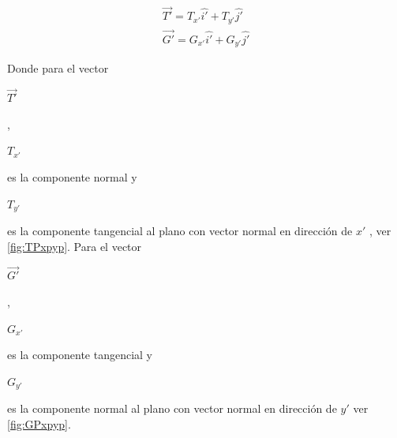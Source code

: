 \documentclass[12pt,letterpaper, twoside, openany]{article}
\begin{document}
%
\begin{large}
	\begin{align}
		\overset{\rightarrow}{T'}= T_{x'} \hat{i'} + T_{y' }\hat{j'} \label{eq:TPcomp}\\
		\overset{\rightarrow}{G'}= G_{x'} \hat{i'} + G_{y' }\hat{j'} \label{eq:GPcomp}			
	\end{align}
\end{large}
%
Donde para el vector  \begin{large} $\overset{\rightarrow}{T'}$\end{large}, \begin{large} $T_{x'}$\end{large} es la componente normal y \begin{large} $T_{y'}$\end{large} es la componente tangencial al plano con vector normal en dirección de ${x'}$ , ver \cref{fig:TPxpyp}. Para el vector \begin{large} $\overset{\rightarrow}{G'}$\end{large}, \begin{large} $G_{x'}$\end{large} es la componente tangencial y \begin{large} $G_{y'}$\end{large} es la componente normal al plano con vector normal en dirección de ${y'}$ ver \cref{fig:GPxpyp}.
\end{document}

